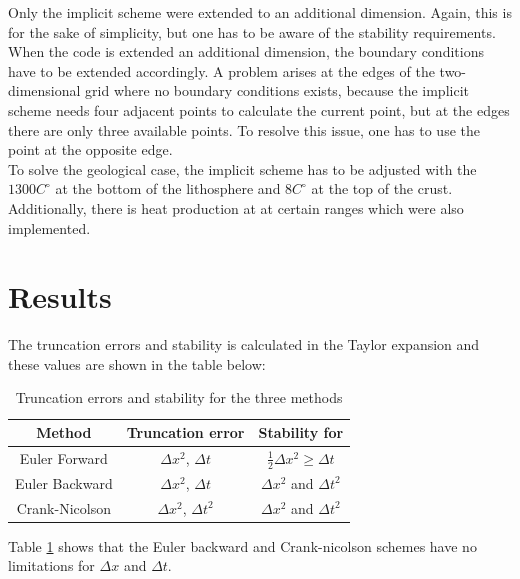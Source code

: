 \documentclass[10pt,a4paper]{article}
\begin{document}
\noindent Only the implicit scheme were extended to an additional dimension. Again, this is for the sake of simplicity, but one has to be aware of the stability requirements.
\\
When the code is extended an additional dimension, the boundary conditions have to be extended accordingly. A problem arises at the edges of the two-dimensional grid where no boundary conditions exists, because the implicit scheme needs four adjacent points to calculate the current point, but at the edges there are only three available points. To resolve this issue, one has to use the point at the opposite edge.
\\
To solve the geological case, the implicit scheme has to be adjusted with the $1300 C^{\circ}$ at the bottom of the lithosphere and $8 C^{\circ}$ at the top of the crust. Additionally, there is heat production at at certain ranges which were also implemented.



\newpage
\section*{Results}


\noindent The truncation errors and stability is calculated in the Taylor expansion and these values are shown in the table below:


\begin{table}[H]
\centering
\caption{Truncation errors and stability for the three methods}
\begin{tabular}{|c|c|c|}
\hline
Method & Truncation error & Stability for\\
\hline
Euler Forward & $\Delta x^2$, $\Delta t$ & $\frac{1}{2} \Delta x^2 \geq \Delta t$\\
\hline
Euler Backward & $\Delta x^2$, $\Delta t$ & $\Delta x^2$ and $\Delta t^2$\\
\hline
Crank-Nicolson & $\Delta x^2$, $\Delta t^2$ & $\Delta x^2$ and $\Delta t^2$\\
\hline
\end{tabular}
\label{truncstab}
\end{table}
 

\noindent Table \ref{truncstab} shows that the Euler backward and Crank-nicolson schemes have no limitations for $\Delta x$ and $\Delta t$. 
\end{document}

